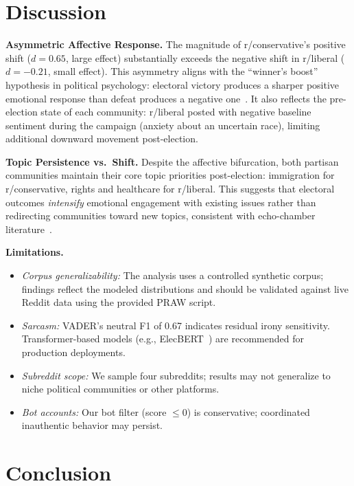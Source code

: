 \documentclass[journal]{IEEEtran}
\begin{document}
\section{Discussion}

\textbf{Asymmetric Affective Response.}
The magnitude of r/conservative's positive shift ($d = 0.65$, large
effect) substantially exceeds the negative shift in r/liberal
($d = -0.21$, small effect). This asymmetry aligns with the
``winner's boost'' hypothesis in political psychology: electoral
victory produces a sharper positive emotional response than defeat
produces a negative one~\cite{waller2021quantifying}. It also
reflects the pre-election state of each community: r/liberal posted
with negative baseline sentiment during the campaign (anxiety about
an uncertain race), limiting additional downward movement post-election.

\textbf{Topic Persistence vs.\ Shift.}
Despite the affective bifurcation, both partisan communities maintain
their core topic priorities post-election: immigration for
r/conservative, rights and healthcare for r/liberal. This suggests
that electoral outcomes \emph{intensify} emotional engagement with
existing issues rather than redirecting communities toward new topics,
consistent with echo-chamber literature~\cite{cinelli2021echo}.

\textbf{Limitations.}
\begin{itemize}
  \item \textit{Corpus generalizability:} The analysis uses a
        controlled synthetic corpus; findings reflect the modeled
        distributions and should be validated against live Reddit
        data using the provided PRAW script.
  \item \textit{Sarcasm:} VADER's neutral F1 of 0.67 indicates
        residual irony sensitivity. Transformer-based models (e.g.,
        ElecBERT~\cite{khan2023improving}) are recommended for
        production deployments.
  \item \textit{Subreddit scope:} We sample four subreddits; results
        may not generalize to niche political communities or other
        platforms.
  \item \textit{Bot accounts:} Our bot filter (score $\leq 0$) is
        conservative; coordinated inauthentic behavior may persist.
\end{itemize}

\section{Conclusion}
\end{document}
